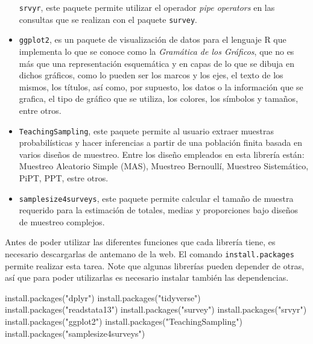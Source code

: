 \documentclass[
  12pt,
]{book}
\newenvironment{Shaded}{\begin{snugshade}}{\end{snugshade}}
\newcommand{\FunctionTok}[1]{\textcolor[rgb]{0.00,0.00,0.00}{#1}}
\newcommand{\NormalTok}[1]{#1}
\newcommand{\StringTok}[1]{\textcolor[rgb]{0.31,0.60,0.02}{#1}}
\begin{document}
\begin{itemize}
  \texttt{srvyr}, este paquete permite utilizar el operador \emph{pipe operators} en las consultas que se realizan con el paquete \texttt{survey}.
\item
  \texttt{ggplot2}, es un paquete de visualización de datos para el lenguaje R que implementa lo que se conoce como la \emph{Gramática de los Gráficos}, que no es más que una representación esquemática y en capas de lo que se dibuja en dichos gráficos, como lo pueden ser los marcos y los ejes, el texto de los mismos, los títulos, así como, por supuesto, los datos o la información que se grafica, el tipo de gráfico que se utiliza, los colores, los símbolos y tamaños, entre otros.
\item
  \texttt{TeachingSampling}, este paquete permite al usuario extraer muestras probabilísticas y hacer inferencias a partir de una población finita basada en varios diseños de muestreo. Entre los diseño empleados en esta librería están: Muestreo Aleatorio Simple (MAS), Muestreo Bernoullí, Muestreo Sistemático, PiPT, PPT, estre otros.
\item
  \texttt{samplesize4surveys}, este paquete permite calcular el tamaño de muestra requerido para la estimación de totales, medias y proporciones bajo diseños de muestreo complejos.
\end{itemize}

Antes de poder utilizar las diferentes funciones que cada librería tiene, es necesario descargarlas de antemano de la web. El comando \texttt{install.packages} permite realizar esta tarea. Note que algunas librerías pueden depender de otras, así que para poder utilizarlas es necesario instalar también las dependencias.

\begin{Shaded}
\begin{Highlighting}[]
\FunctionTok{install.packages}\NormalTok{(}\StringTok{"dplyr"}\NormalTok{)}
\FunctionTok{install.packages}\NormalTok{(}\StringTok{"tidyverse"}\NormalTok{)}
\FunctionTok{install.packages}\NormalTok{(}\StringTok{"readstata13"}\NormalTok{) }
\FunctionTok{install.packages}\NormalTok{(}\StringTok{"survey"}\NormalTok{)}
\FunctionTok{install.packages}\NormalTok{(}\StringTok{"srvyr"}\NormalTok{)}
\FunctionTok{install.packages}\NormalTok{(}\StringTok{"ggplot2"}\NormalTok{)}
\FunctionTok{install.packages}\NormalTok{(}\StringTok{"TeachingSampling"}\NormalTok{)}
\FunctionTok{install.packages}\NormalTok{(}\StringTok{"samplesize4surveys"}\NormalTok{)}
\end{Highlighting}
\end{Shaded}
\end{document}
